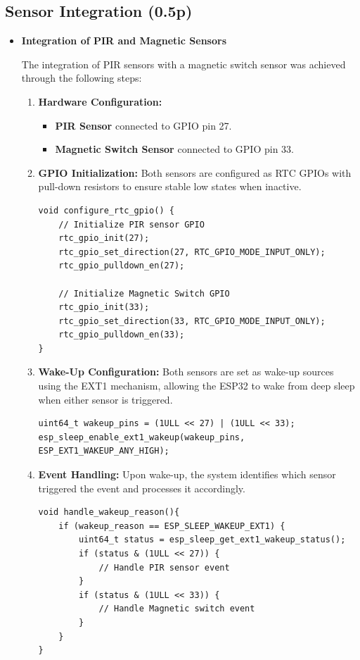 \documentclass[A4,10pt]{article}
\begin{document}
\subsection{Sensor Integration (0.5p)}

\begin{itemize}
	\item \textbf{Integration of PIR and Magnetic Sensors}
	
	The integration of PIR sensors with a magnetic switch sensor was achieved through the following steps:

	\begin{enumerate}
		\item \textbf{Hardware Configuration:} 
		\begin{itemize}
			\item \textbf{PIR Sensor} connected to GPIO pin 27.
			\item \textbf{Magnetic Switch Sensor} connected to GPIO pin 33.
		\end{itemize}
		
		\item \textbf{GPIO Initialization:} 
		Both sensors are configured as RTC GPIOs with pull-down resistors to ensure stable low states when inactive.
		
		\begin{verbatim}
void configure_rtc_gpio() {
    // Initialize PIR sensor GPIO
    rtc_gpio_init(27);
    rtc_gpio_set_direction(27, RTC_GPIO_MODE_INPUT_ONLY);
    rtc_gpio_pulldown_en(27);
    
    // Initialize Magnetic Switch GPIO
    rtc_gpio_init(33);
    rtc_gpio_set_direction(33, RTC_GPIO_MODE_INPUT_ONLY);
    rtc_gpio_pulldown_en(33);
}
		\end{verbatim}
		
		\item \textbf{Wake-Up Configuration:} 
		Both sensors are set as wake-up sources using the EXT1 mechanism, allowing the ESP32 to wake from deep sleep when either sensor is triggered.
		\begin{verbatim}
uint64_t wakeup_pins = (1ULL << 27) | (1ULL << 33);
esp_sleep_enable_ext1_wakeup(wakeup_pins, ESP_EXT1_WAKEUP_ANY_HIGH);
		\end{verbatim}
		
		\item \textbf{Event Handling:} 
		Upon wake-up, the system identifies which sensor triggered the event and processes it accordingly.
		\begin{verbatim}
void handle_wakeup_reason(){
    if (wakeup_reason == ESP_SLEEP_WAKEUP_EXT1) {
        uint64_t status = esp_sleep_get_ext1_wakeup_status();
        if (status & (1ULL << 27)) {
            // Handle PIR sensor event
        }
        if (status & (1ULL << 33)) {
            // Handle Magnetic switch event
        }
    }
}
		\end{verbatim}
			\end{enumerate}
\end{itemize}
\end{document}
